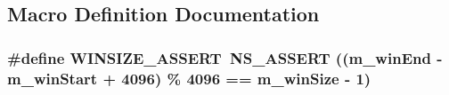 \subsection{Macro Definition Documentation}
\subsubsection[{\texorpdfstring{W\+I\+N\+S\+I\+Z\+E\+\_\+\+A\+S\+S\+E\+RT}{WINSIZE_ASSERT}}]{\setlength{\rightskip}{0pt plus 5cm}\#define W\+I\+N\+S\+I\+Z\+E\+\_\+\+A\+S\+S\+E\+RT~{\bf N\+S\+\_\+\+A\+S\+S\+E\+RT} ((m\+\_\+win\+End -\/ m\+\_\+win\+Start + 4096) \% 4096 == m\+\_\+win\+Size -\/ 1)}\hypertarget{block-ack-cache_8cc_afef56394603e35fab34774311bbdc3fa}{}\label{block-ack-cache_8cc_afef56394603e35fab34774311bbdc3fa}
